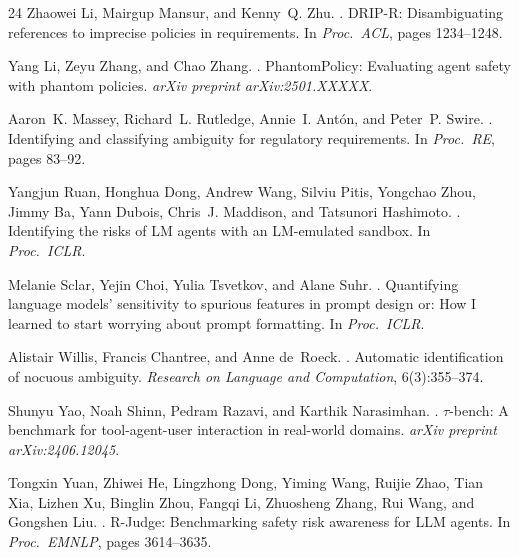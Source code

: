 \documentclass[11pt]{article}
\begin{document}
\begin{thebibliography}{24}
Zhaowei Li, Mairgup Mansur, and Kenny~Q. Zhu.
.
\newblock DRIP-R: Disambiguating references to imprecise policies in requirements.
\newblock In \emph{Proc.\ ACL}, pages 1234--1248.

Yang Li, Zeyu Zhang, and Chao Zhang.
.
\newblock PhantomPolicy: Evaluating agent safety with phantom policies.
\newblock \emph{arXiv preprint arXiv:2501.XXXXX}.

Aaron~K. Massey, Richard~L. Rutledge, Annie~I. Ant\'on, and Peter~P. Swire.
.
\newblock Identifying and classifying ambiguity for regulatory requirements.
\newblock In \emph{Proc.\ RE}, pages 83--92.

Yangjun Ruan, Honghua Dong, Andrew Wang, Silviu Pitis, Yongchao Zhou, Jimmy Ba, Yann Dubois, Chris~J. Maddison, and Tatsunori Hashimoto.
.
\newblock Identifying the risks of LM agents with an LM-emulated sandbox.
\newblock In \emph{Proc.\ ICLR}.

Melanie Sclar, Yejin Choi, Yulia Tsvetkov, and Alane Suhr.
.
\newblock Quantifying language models' sensitivity to spurious features in prompt design or: How I learned to start worrying about prompt formatting.
\newblock In \emph{Proc.\ ICLR}.

Alistair Willis, Francis Chantree, and Anne de~Roeck.
.
\newblock Automatic identification of nocuous ambiguity.
\newblock \emph{Research on Language and Computation}, 6(3):355--374.

Shunyu Yao, Noah Shinn, Pedram Razavi, and Karthik Narasimhan.
.
\newblock $\tau$-bench: A benchmark for tool-agent-user interaction in real-world domains.
\newblock \emph{arXiv preprint arXiv:2406.12045}.

Tongxin Yuan, Zhiwei He, Lingzhong Dong, Yiming Wang, Ruijie Zhao, Tian Xia, Lizhen Xu, Binglin Zhou, Fangqi Li, Zhuosheng Zhang, Rui Wang, and Gongshen Liu.
.
\newblock R-Judge: Benchmarking safety risk awareness for LLM agents.
\newblock In \emph{Proc.\ EMNLP}, pages 3614--3635.


\end{thebibliography}
\end{document}

